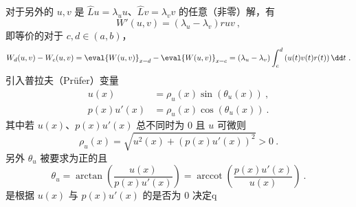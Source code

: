对于另外的 $u, v$ 是 $\hat L u = \lambda_u u$、$\hat L v = \lambda_v v$ 的任意（非零）解，有
\begin{equation}
W'(u, v) = (\lambda_u - \lambda_v) r u v~,
\end{equation}
即等价的对于 $c, d \in (a, b)$，
\begin{equation}
W_d(u, v) - W_c(u, v) = \eval{W(u, v)}_{x = d} - \eval{W(u, v)}_{x = c} = (\lambda_u - \lambda_v) \int_c^d \left(u(t) v(t) r(t) \right) \dd t ~.
\end{equation}
引入普拉夫（Prüfer）变量
\begin{equation}
\begin{aligned}
u(x) &= \rho_u(x) \sin(\theta_u(x)) ~,\\
p(x) u'(x) &= \rho_u(x) \cos(\theta_u(x)) ~.
\end{aligned}
\end{equation}
其中若 $u(x)$、$p(x)u'(x)$ 总不同时为 $0$ 且 $u$ 可微则
\begin{equation}
\rho_u(x) = \sqrt{u^2(x) + \left(p(x) u'(x)\right)^2} > 0 ~.
\end{equation}
另外 $\theta_u$ 被要求为正的且
\begin{equation}
\theta_u = \arctan\left(\frac{u(x)}{p(x) u'(x)}\right) = \operatorname{arccot}\left(\frac{p(x) u'(x)}{u(x)}\right) ~.
\end{equation}
是根据 $u(x)$ 与 $p(x) u'(x)$ 的是否为 $0$ 决定q